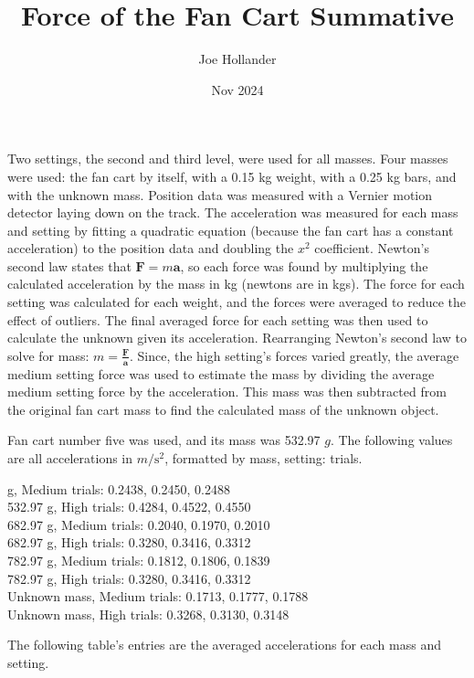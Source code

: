 \documentclass{article}
\title{Force of the Fan Cart Summative}
\author{Joe Hollander}
\date{Nov 2024}
\newcommand{\mps}{$\si{m\per\second^2}$}
\begin{document}
\maketitle 


Two settings, the second and third level, were used for all masses. Four masses were used:
the fan cart by itself, with a 0.15 kg weight, with a 0.25 kg bars,
and with the unknown mass. 
Position data was measured with a Vernier motion detector laying down on the track. 
The acceleration was measured for each mass and setting by fitting a quadratic equation
(because the fan cart has a constant acceleration)
to the position data and doubling the $x^2$ coefficient. 
Newton's second law states that $\mathbf{F} = m \mathbf{a}$, so each force was found by multiplying
the calculated acceleration by the mass in kg (newtons are in kgs). 
The force for each setting was calculated for each weight, and the forces were averaged to 
reduce the effect of outliers. 
The final averaged force for each setting was then used to calculate the unknown given its acceleration.
Rearranging Newton's second law to solve for mass: $m = \mathbf{\frac{F}{a}}$. 
Since, the high setting's forces varied greatly, the average medium setting force was used to estimate the mass by
dividing the average medium setting force by the acceleration. 
This mass was then subtracted from the original fan cart mass to find the calculated mass of the unknown object.

Fan cart number five was used, and its mass was 532.97 $\si{g}$. 
The following values are all accelerations in \mps, formatted by mass, setting: trials.

\medskip

 g, Medium trials: 0.2438, 0.2450, 0.2488 \\
532.97 g, High trials: 0.4284, 0.4522, 0.4550 \\
682.97 g, Medium trials: 0.2040, 0.1970, 0.2010 \\
682.97 g, High trials: 0.3280, 0.3416, 0.3312 \\
782.97 g, Medium trials: 0.1812, 0.1806, 0.1839 \\
782.97 g, High trials: 0.3280, 0.3416, 0.3312 \\
Unknown mass, Medium trials: 0.1713, 0.1777, 0.1788 \\
Unknown mass, High trials: 0.3268, 0.3130, 0.3148
\medskip

The following table's entries are the averaged accelerations for each mass and setting. 
\end{document}
